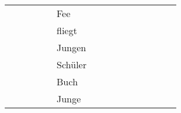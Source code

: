 \begin{center}
\begin{tabular}{lllllllllllllll}
       &            &                       &         &          &                   Fee &                                         &                                         &                                                    &                                         &                                                    &                                         &                                         &          &        \\
       &            &                       &         &          &                fliegt &                                         &                                         &                                                    &                                         &                                                    &                                         &                                         &          &        \\
       &            &                       &         &          &                Jungen &                                         &                                         &                                                    &                                         &                                                    &                                         &                                         &          &        \\
       &            &                       &         &          &               Schüler &                                         &                                         &                                                    &                                         &                                                    &                                         &                                         &          &        \\
       &            &                       &         &          &                  Buch &                                         &                                         &                                                    &                                         &                                                    &                                         &                                         &          &        \\
       &            &                       &         &          &                 Junge &                                         &                                         &                                                    &                                         &                                                    &                                         &                                         &          &        \\

\end{tabular}
\end{center}
